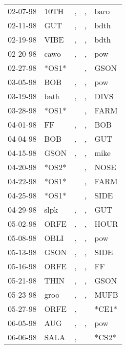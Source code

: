 \begin{supertabular}{lllll}
 02-07-98 &   10TH &                , &                , &   baro \\
 02-11-98 &    GUT &                , &                , &   bdth \\
 02-19-98 &   VIBE &                , &                , &   bdth \\
 02-20-98 &   cawo &                , &                , &    pow \\
 02-27-98 &  *OS1* &                  &                , &   GSON \\
 03-05-98 &    BOB &                , &                , &    pow \\
 03-19-98 &   bath &                , &                , &   DIVS \\
 03-28-98 &  *OS1* &                  &                , &   FARM \\
 04-01-98 &     FF &                , &                , &    BOB \\
 04-04-98 &    BOB &                , &                , &    GUT \\
 04-15-98 &   GSON &                , &                , &   mike \\
 04-20-98 &  *OS2* &                  &                , &   NOSE \\
 04-22-98 &  *OS1* &                  &                , &   FARM \\
 04-25-98 &  *OS1* &                  &                , &   SIDE \\
 04-29-98 &   slpk &                , &                , &    GUT \\
 05-02-98 &   ORFE &                , &                , &   HOUR \\
 05-08-98 &   OBLI &                , &                , &    pow \\
 05-13-98 &   GSON &                , &                , &   SIDE \\
 05-16-98 &   ORFE &                , &                , &     FF \\
 05-21-98 &   THIN &                , &                , &   GSON \\
 05-23-98 &   groo &                , &                , &   MUFB \\
 05-27-98 &   ORFE &                , &                  &  *CE1* \\
 06-05-98 &    AUG &                , &                , &    pow \\
 06-06-98 &   SALA &                , &                  &  *CS2* \\

\end{supertabular}
